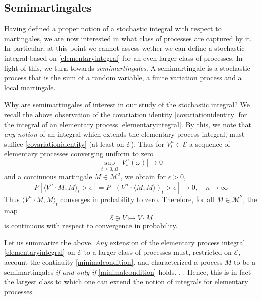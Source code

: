 \subsection*{Semimartingales}

Having defined a proper notion of a stochastic integral with respect to martingales, we are now interested in what class of processes are captured by it. In particular, at this point we cannot assess wether we can define a stochastic integral based on \eqref{elementaryintegral} for an even larger class of processes. In light of this, we turn towards \emph{semimartingales}. A semimartingale is a stochastic process that is the sum of a random variable, a finite variation process and a local martingale.

Why are semimartingales of interest in our study of the stochastic integral? We recall the above observation of the covariation identity \eqref{covariationidentity} for the integral of an elementary process \eqref{elementaryintegral}. By this, we note that \emph{any notion} of an integral which extends the elementary process integral, must suffice \eqref{covariationidentity} (at least on $\mathcal{E}$). Thus for $V^n_t \in \mathcal{E}$ a sequence of elementary processes converging uniform to zero
\begin{equation*}
	\sup_{t \geq 0, \Omega} | V_s^n (\omega)| \rightarrow 0
\end{equation*}
and a continuous martingale $M \in \mathcal{M}^2$, we obtain for $\epsilon > 0$,
\begin{equation*}
	P[ \langle V^n \cdot M, M \rangle_t > \epsilon] = P[(V^n \cdot \langle M, M \rangle)_t > \epsilon] \rightarrow 0, \quad n \rightarrow \infty
\end{equation*}
Thus $\langle V^n \cdot M, M \rangle_t$ converges in probability to zero. Therefore, for all $M \in \mathcal{M}^2$, the map
\begin{equation}\label{minimalcondition}
	\mathcal{E} \ni V \mapsto V \cdot M 
\end{equation}
is continuous with respect to convergence in probability.

Let us summarize the above. \emph{Any} extension of the elementary process integral \eqref{elementaryintegral} on $\mathcal{E}$ to a larger class of processes must, restricted on $\mathcal{E}$, account the continuity \eqref{minimalcondition}. \citeauthor{Bichteler} and \citeauthor{Dellacherie} characterized a process $M$ to be a semimartingales \emph{if and only if} \eqref{minimalcondition} holds. \cite{Bichteler}, \cite{Dellacherie} \cite[thm. 20.22]{Kallenberg}. Hence, this is in fact the largest class to which one can extend the notion of integrals for elementary processes.

